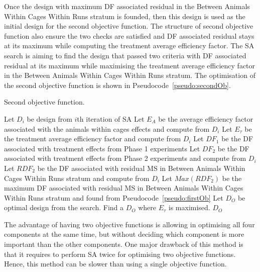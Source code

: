 \documentclass[article]{jss}
\begin{document}
Once the design with maximum DF associated residual in the Between Animals Within Cages Within Runs stratum is founded, then this design is used as the initial design for the second objective function. The structure of second objective function also ensure the two checks are satisfied and DF associated residual stays at its maximum while computing the treatment average efficiency factor. The SA search is aiming to find the design that passed two criteria with DF associated residual at its maximum while maximising the treatment average efficiency factor in the Between Animals Within Cages Within Runs stratum. The optimisation of the second objective function is shown in Pseudocode~\ref{pseudo:secondOb}.
  
 \begin{algorithm}[ht]                     
\caption{Second objective function.}         
\label{pseudo:secondOb}                           
\begin{algorithmic}[1]
\STATE Let $D_i$ be design from $i$th iteration of SA
\STATE Let $E_A$ be the average efficiency factor associated with the animals within cages effects and compute from $D_i$
\STATE Let $E_\tau$ be the treatment average efficiency factor and compute from $D_i$
\STATE Let $DF_1$ be the DF associated with treatment effects from Phase 1 experiments
\STATE Let $DF_2$ be the DF associated with treatment effects from Phase 2 experiments and compute from $D_i$
\STATE Let $RDF_2$ be the DF associated with residual MS in Between Animals Within Cages Within Runs stratum and compute from $D_i$
\STATE Let $Max(RDF_2)$ be the maximum DF associated with residual MS in Between Animals Within Cages Within Runs stratum and found from Pseudocode~\ref{pseudo:firstOb}
\STATE Let $D_O$ be optimal design from the search.
\ENDIF
{}
\ENDIF
{}
\ENDIF
\STATE Find a $D_O$ where $E_\tau$ is maximised. 
\RETURN $D_O$
\end{algorithmic}
\end{algorithm}

The advantage of having two objective functions is allowing in optimising all four components at the same time, but without deciding which component is more important than the other components. One major drawback of this method is that it requires to perform SA twice for optimising two objective functions. Hence, this method can be slower than using a single objective function. 
\end{document}
